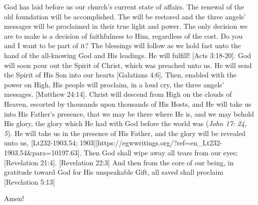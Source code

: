God has laid before us our church’s current state of affairs. The renewal of the old foundation will be accomplished. The  will be restored and the three angels’ messages will be proclaimed in their true light and power. The only decision we are to make is a decision of faithfulness to Him, regardless of the cost. Do you and I want to be part of it? The blessings will follow as we hold fast unto the hand of the all-knowing God and His leadings.  He will fulfill! [Acts 3:18-20]. God will soon pour out the Spirit of Christ, which was preached unto us. He will send the Spirit of His Son into our hearts [Galatians 4:6].  Then, enabled with the power on High, His people will proclaim, in a loud cry, the three angels’ messages. [Matthew 24:14]. Christ will descend from High on the clouds of Heaven, escorted by thousands upon thousands of His Hosts, and He will take us into His Father’s presence, that we may be there where He is, and we may behold His glory, the glory which He had with God before the world was (\textit{John 17: 24, 5}). He will take us in the presence of His Father, and the glory will be revealed unto us, [Lt232-1903.54; 1903][https://egwwritings.org/?ref=en\_Lt232-1903.54&para=10197.63]. Then God shall wipe away all tears from our eyes; [Revelation 21:4]. [Revelation 22:3] And then from the core of our being, in gratitude toward God for His unspeakable Gift, all saved  shall proclaim [Revelation 5:13]

Amen!